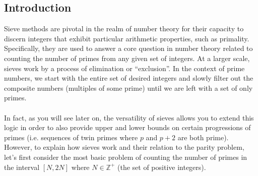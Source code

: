 \documentclass[8pt]{extarticle}
\begin{document}
\subsection{Introduction}
Sieve methods are pivotal in the realm of number theory for their capacity to discern integers that exhibit particular arithmetic properties, such as primality. 
Specifically, they are used to answer a core question in number theory related to counting the number of primes from any given set of integers. 
At a larger scale, sieves work by a process of elimination or ``exclusion''. In the context of prime numbers, we start with the entire set of desired integers and slowly filter out the composite numbers (multiples of some prime) until we are left with a set of only primes. \\
\\
In fact, as you will see later on, the versatility of sieves allows you to extend this logic in order to also provide upper and lower bounds on certain progressions of primes (i.e. sequences of twin primes where $p$ and $p+2$ are both prime).
However, to explain how sieves work and their relation to the parity problem, let's first consider the most basic problem of counting the number of primes in the interval $[N, 2N]$ where $N \in \mathbb{Z}^+$ (the set of positive integers). 
\end{document}
